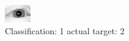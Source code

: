 \begin{figure}[h!]
\begin{center}
\includegraphics[width=0.60\columnwidth]{figures/ID3087_class_1_target_2.png}
\end{center}
\caption{ Classification: 1 actual target: 2}
\label{fig:ID3087_class_1_target_2}
\end{figure}
